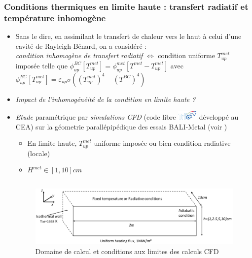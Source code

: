 \subsubsection{Conditions thermiques en limite haute : transfert radiatif et température inhomogène}
\begin{frame}[fragile]
\begin{itemize}
\item Sans le dire, en assimilant le transfert de chaleur vers le haut à celui d'une cavité de Rayleigh-Bénard, on a considéré : \\
\emph{condition inhomogène de transfert radiatif} $\Leftrightarrow$ condition uniforme $T_{up}^{met}$ imposée telle que $\phi_{up}^{BC}\left[T_{up}^{met}\right] = \phi_{up}^{met}\left[T^{met}-T_{up}^{met}\right]$ avec $\phi^{BC}_{up}\left[T^{met}_{up}\right]=\varepsilon_{up}\sigma\left(\left(T^{met}_{up}\right)^4-\left(T^{BC}\right)^4\right)$
\item \emph{Impact de l'inhomogénéité de la condition en limite haute ?}
\item \emph{Etude} paramétrique par \emph{simulations CFD} (code libre \includegraphics[width=1cm]{Figures/Logo_TrioCFD.eps} développé au CEA) sur la géometrie parallépipédique des essais BALI-Metal (voir \cite{Peybernes2020})
\begin{itemize}
\item En limite haute, $T_{up}^{met}$ uniforme imposée ou bien condition radiative (locale)
\item $H^{met} \in [1, 10]cm$
\end{itemize}
\begin{columns}[T]
    \begin{column}{0.7\textwidth}
\begin{figure}[H]
\centering \includegraphics[width=\textwidth]{Figures/Fig3_Peybernes2020.png} \\
{\tiny Domaine de calcul et conditions aux limites des calculs CFD}

\end{figure}
\end{column}
\end{columns}
\end{itemize}
\end{frame}
